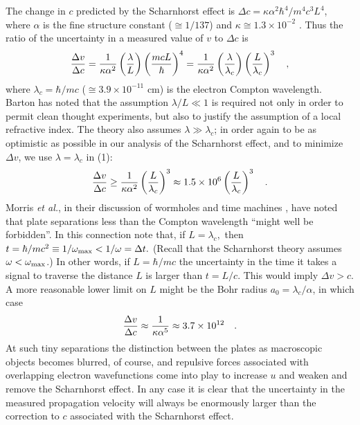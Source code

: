 The change in $c$ predicted by the Scharnhorst effect is $\Delta
c=\kappa \alpha^2 \hbar^4 /m^4c^3L^4$, where $\alpha$ is the fine
structure constant ($\cong 1/137$) and $\kappa \cong 1.3\times 10^{-2}$
\cite{barton}. Thus the ratio of the uncertainty in a measured value of
$v$ to $\Delta c$ is
\begin{equation}
{\Delta v\over \Delta c}={1\over \kappa \alpha^2}\left({\lambda \over
L}\right) \left( {mcL\over \hbar }\right)^4={1\over \kappa \alpha^2}
\left({\lambda \over
\lambda_c}\right) \left( {L\over \lambda_c }\right)^3
\quad ,
\end{equation}
where $\lambda_c=\hbar /mc$ ($\cong 3.9\times 10^{-11}$ cm) is the
electron Compton wavelength.
Barton has noted that the assumption $\lambda /L \ll 1$ is required not
only in order to permit clean thought experiments, but also to justify
the assumption of a local refractive index.
The theory also assumes $\lambda \gg \lambda_c$; in order again to be as
optimistic as possible in our analysis of the Scharnhorst effect, and to
minimize $\Delta v$, we use $\lambda =\lambda_c$ in (1):
\begin{equation}
{\Delta v\over \Delta c}\ge {1\over \kappa \alpha^2}\left({L\over
\lambda_c}\right)^3\approx 1.5\times 10^6 \left({L\over
\lambda_c}\right)^3 \quad .
\end{equation}
Morris {\it et al.}, in their discussion of wormholes and time machines
\cite{thorne}, have noted that plate separations less than the Compton
wavelength ``might well be forbidden''. In this connection note that,
if $L = \lambda_c,$ then $t = \hbar/mc^2 \equiv 1/\omega_{\rm max} <
1/\omega = \Delta t. $
(Recall that the Scharnhorst theory assumes $\omega < \omega_{\rm max}$.)
In other words, if $L = \hbar /mc$ the uncertainty in the time it takes a
signal to traverse the distance $L$ is larger than $t = L/c.$
This would imply $\Delta v > c.$ A more reasonable lower limit on $L$ might
 be the Bohr radius
$a_0=\lambda_c/\alpha$, in which case
\begin{equation}
{\Delta v\over \Delta c}\approx {1\over \kappa \alpha^5}\approx
3.7\times 10^{12}\quad .
\end{equation}
At such tiny separations the distinction between the plates as
macroscopic objects becomes blurred, of course, and repulsive forces
associated with overlapping electron wavefunctions come into play to
increase $u$ and weaken and remove the Scharnhorst effect. In any case
it is clear that the uncertainty in the measured propagation velocity
will always be enormously larger than the correction to $c$ associated
with the Scharnhorst effect.

